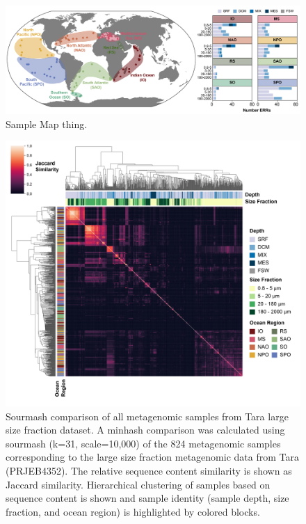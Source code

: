 \documentclass[12pt]{article}
\numberwithin{equation}{section}
\begin{document}
\begin{landscape}
\begin{figure}
    \centering
    \includegraphics[width=0.95\columnwidth]{si-figures/Tara_stationMap-01.png}
    \caption{Sample Map thing.}
    \label{fig:tara-map}
\end{figure}
\end{landscape}



\begin{figure}
    \centering
    \includegraphics[width=0.95\columnwidth]{si-figures/modified-sourmash-region-size_depth-01.png}
    \caption{Sourmash comparison of all metagenomic samples from Tara large size fraction dataset. A minhash comparison was calculated using sourmash (k=31, scale=10,000) of the 824 metagenomic samples corresponding to the large size fraction metagenomic data from Tara (PRJEB4352). The relative sequence content similarity is shown as Jaccard similarity. Hierarchical clustering of samples based on sequence content is shown and sample identity (sample depth, size fraction, and ocean region) is highlighted by colored blocks.}
    \label{fig:sourmash}
\end{figure}
\end{document}
